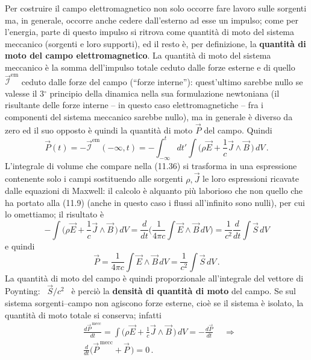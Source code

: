 Per costruire il campo elettromagnetico non solo occorre fare lavoro sulle
sorgenti ma, in generale, occorre anche cedere dall'esterno ad esse un impulso;
come per l'energia, parte di questo impulso si ritrova come quantit\`a di moto
del sistema meccanico (sorgenti e loro supporti), ed il resto \`e, per
definizione, la \textbf{quantit\`a di moto del campo elettromagnetico}. La
quantit\`a di moto del sistema meccanico \`e la somma dell'impulso totale ceduto
dalle forze esterne e di quello $\vec{\mathcal I}^\mathrm{em}$ ceduto dalle
forze del campo (``forze interne''): quest'ultimo sarebbe nullo se valesse il
3$^\circ$ principio della dinamica nella sua formulazione newtoniana (il
risultante delle forze interne -- in questo caso elettromagnetiche -- fra i
componenti del sistema meccanico sarebbe nullo), ma in generale \`e diverso da
zero ed il suo opposto \`e quindi la quantit\`a di moto $\vec P$ del campo.
Quindi
\begin{equation}
  \vec P(t)=-\vec{\mathcal I}^\mathrm{em}(-\infty,t)=-\int_{-\infty}^tdt'
  \int\big(\rho\vec E+\frac{1}{c}\vec J\wedge\vec B\,\big)\,dV\,.
  \tag{11.36}
\end{equation}
L'integrale di volume che compare nella (11.36) si trasforma in una espressione
contenente solo i campi sostituendo alle sorgenti $\rho,\vec J$ le loro
espressioni ricavate dalle equazioni di Maxwell: il calcolo \`e alquanto pi\`u
laborioso che non quello che ha portato alla (11.9) (anche in questo caso i
flussi all'infinito sono nulli), per cui lo omettiamo; il risultato \`e
\begin{equation}
  -\int\big(\rho\vec E+\frac{1}{c}\vec J\wedge\vec B\,\big)\,dV
  =\frac{d}{dt}\Big(\frac{1}{4\pi c}\int\vec E\wedge\vec B\,dV\Big)
  =\frac{1}{c^2}\frac{d}{dt}\int\vec S\,dV
  \tag{11.37}
\end{equation}
e quindi
\begin{equation}
  \vec P=\frac{1}{4\pi c}\int\vec E\wedge\vec B\,dV
  =\frac{1}{c^2}\int\vec S\,dV\,.
  \tag{11.38}
\end{equation}
La quantit\`a di moto del campo \`e quindi proporzionale all'integrale del
vettore di Poynting: \ $\vec S/c^2$ \ \`e perci\`o la \textbf{densit\`a di
quantit\`a di moto} del campo.
Se sul sistema sorgenti--campo non agiscono forze esterne, cio\`e se il sistema
\`e isolato, la quantit\`a di moto totale si conserva; infatti
\begin{equation}
  \begin{aligned}
    &\frac{d\vec P^\mathrm{\,mecc}}{dt}
    =\int\big(\rho\vec E+\frac{1}{c}\vec J\wedge\vec B\,\big)\,dV
    =-\frac{d\vec P}{dt}\quad\ \Rightarrow\\
    &\frac{d}{dt}\big(\vec P^\mathrm{\,mecc}+\vec P\,\big)=0\,.
  \end{aligned}
  \tag{11.39}
\end{equation}

